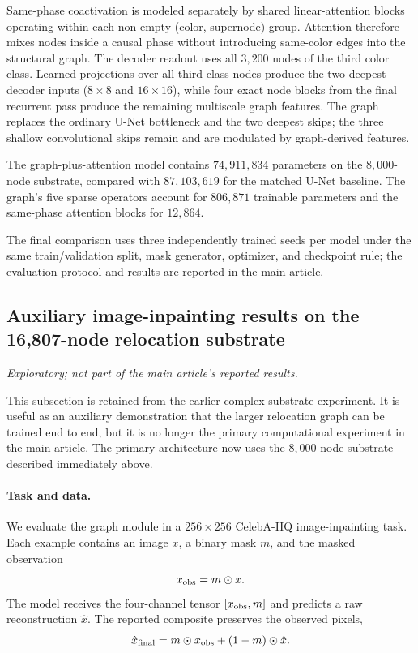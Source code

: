 \documentclass[12pt]{article}
\begin{document}
Same-phase coactivation is modeled separately by shared linear-attention
blocks operating within each non-empty (color, supernode) group. Attention
therefore mixes nodes inside a causal phase without introducing same-color
edges into the structural graph. The decoder readout uses all $3{,}200$ nodes
of the third color class. Learned projections over all third-class nodes
produce the two deepest decoder inputs ($8\times8$ and $16\times16$), while
four exact node blocks from the final recurrent pass produce the remaining
multiscale graph features. The graph replaces the ordinary U-Net bottleneck
and the two deepest skips; the three shallow convolutional skips remain and
are modulated by graph-derived features.

The graph-plus-attention model contains $74{,}911{,}834$ parameters on the
$8{,}000$-node substrate, compared with $87{,}103{,}619$ for the matched U-Net
baseline. The graph's five sparse operators account for $806{,}871$ trainable
parameters and the same-phase attention blocks for $12{,}864$.

The final comparison uses three independently trained seeds per model under
the same train/validation split, mask generator, optimizer, and checkpoint
rule; the evaluation protocol and results are reported in the main article.

\subsection{Auxiliary image-inpainting results on the 16,807-node relocation substrate}
\label{supp:inpainting-methods}
\emph{Exploratory; not part of the main article's reported results.}

This subsection is retained from the earlier complex-substrate experiment. It is useful as an auxiliary demonstration that the larger relocation graph can be trained end to end, but it is no longer the primary computational experiment in the main article. The primary architecture now uses the $8{,}000$-node substrate described immediately above.

\paragraph{Task and data.}
We evaluate the graph module in a \(256\times256\) CelebA-HQ image-inpainting
task. Each example contains an image \(x\), a binary mask \(m\), and the
masked observation
\[
x_{\rm obs}=m\odot x.
\]
The model receives the four-channel tensor \([x_{\rm obs},m]\) and predicts a
raw reconstruction \(\hat x\). The reported composite preserves the observed
pixels,
\[
\hat x_{\rm final}
=
m\odot x_{\rm obs}+(1-m)\odot\hat x.
\]
\end{document}
